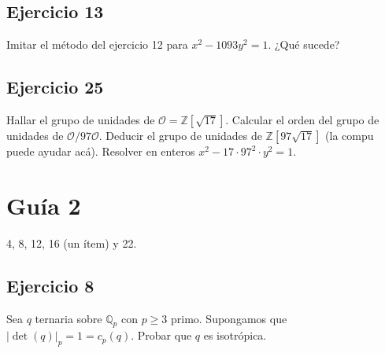 \documentclass[12pt]{amsart}
\newcommand{\QQ}{\mathbb{Q}}
\newcommand{\ZZ}{\mathbb{Z}}
\newcommand{\aaa}{\mathbf{a}}
\newcommand{\bbb}{\mathbf{b}}
\newcommand{\OO}{\mathcal{O}}
\newcommand{\lp}{\left(}
\newcommand{\rp}{\right)}
\theoremstyle{plain}
\begin{document}
\subsection*{Ejercicio 13}
Imitar el método del ejercicio 12 para $x^2 - 1093y^2 = 1$. 
¿Qué sucede?




\subsection*{Ejercicio 25}
Hallar el grupo de unidades de $\OO = \ZZ[\sqrt{17}]$. 
Calcular el orden del grupo de unidades de $\OO/97\OO$. 
Deducir el grupo de unidades de $\ZZ[97\sqrt{17}]$ 
(la compu puede ayudar acá). Resolver en enteros 
$x^2-17\cdot 97^2\cdot y^2=1$.

\section*{Guía 2}

4, 8, 12, 16 (un ítem) y 22.


\subsection*{Ejercicio 8}
Sea $q$ ternaria sobre $\QQ_p$ con $p \geq 3$ primo. 
Supongamos que $|\det(q) |_p = 1 = c_p(q)$. Probar que $q$ es isotrópica.
\end{document}
